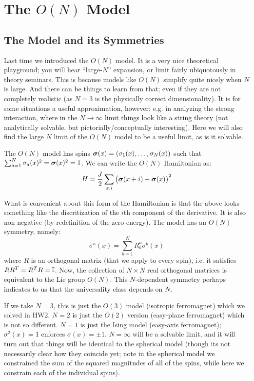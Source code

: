 \section{The $O(N)$ Model}
\subsection{The Model and its Symmetries}
Last time we introduced the $O(N)$ model. It is a very nice theoretical playground; you will hear ``large-$N$'' expansion, or limit fairly ubiquotously in theory seminars. This is because models like $O(N)$ simplify quite nicely when $N$ is large. And there can be things to learn from that; even if they are not completely realistic (as $N = 3$ is the physically correct dimensionality). It is for some situations a useful approximation, however; e.g. in analyzing the strong interaction, where in the $N \to \infty$ limit things look like a string theory (not analytically solvable, but pictorially/conceptually interesting). Here we will also find the large $N$ limit of the $O(N)$ model to be a useful limit, as is it solvable.

The $O(N)$ model has spins $\mbox{\boldmath$ \sigma $}(x) = (\sigma_1(x), \ldots, \sigma_N(x))$ such that $\sum_{a=1}^N \sigma_a(x)^2 = \mbox{\boldmath$ \sigma $}(x)^2 = 1$. We can write the $O(N)$ Hamiltonian as:
\begin{equation}
    H = \frac{J}{2}\sum_{x, i}\left(\mbox{\boldmath$ \sigma $}(x + i) - \mbox{\boldmath$ \sigma $}(x)\right)^2
\end{equation}

What is convenient about this form of the Hamiltonian is that the above looks something like the discritization of the $i$th component of the derivative. It is also non-negative (by redefinition of the zero energy). The model has an $O(N)$ symmetry, namely:
\begin{equation}
    \sigma^a(x) = \sum_{b=1}^N R^a_b\sigma^b(x)
\end{equation}
where $R$ is an orthogonal matrix (that we apply to every spin), i.e. it satisfies $RR^T = R^TR = \mathbb{I}$. Now, the collection of $N \times N$ real orthogonal matrices is equivalent to the Lie group $O(N)$. This $N$-dependent symmetry perhaps indicates to us that the universality class depends on $N$.

If we take $N = 3$, this is just the $O(3)$ model (isotropic ferromagnet) which we solved in HW2. $N = 2$ is just the $O(2)$ version (easy-plane ferromagnet) which is not so different. $N = 1$ is just the Ising model (easy-axis ferromagnet); $\sigma^2(x) = 1$ enforces $\sigma(x) = \pm 1$. $N = \infty$ will be a solvable limit, and it will turn out that things will be identical to the spherical model (though its not necessarily clear how they coincide yet; note in the spherical model we constrained the sum of the squared magnitudes of all of the spins, while here we constrain each of the individual spins).

